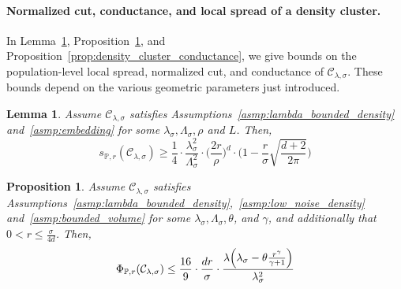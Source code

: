\documentclass[11pt,twoside]{article}
\newtheorem{lemma}{Lemma}
\newtheorem{proposition}{Proposition}
\theoremstyle{definition}
\newcommand{\1}{\mathbf{1}}
\newcommand{\mc}[1]{\mathcal{#1}}
\newcommand{\Pbb}{\mathbb{P}}
\begin{document}
\paragraph{Normalized cut, conductance, and local spread of a density cluster.} In Lemma~\ref{lem:density_cluster_local_spread}, Proposition~\ref{prop:density_cluster_normalized_cut}, and Proposition~\ref{prop:density_cluster_conductance}, we give bounds on the population-level local spread, normalized cut, and conductance of $\mc{C}_{\lambda,\sigma}$. These bounds depend on the various geometric parameters just introduced. 
\begin{lemma}
	\label{lem:density_cluster_local_spread}
	Assume $\mc{C}_{\lambda,\sigma}$ satisfies Assumptions~\ref{asmp:lambda_bounded_density} and~\ref{asmp:embedding} for some $\lambda_{\sigma},\Lambda_{\sigma},\rho$ and $L$. Then,
	\begin{equation}
	\label{eqn:density_cluster_local_spread}
	s_{\Pbb,r}(\mc{C}_{\lambda,\sigma}) \geq \frac{1}{4} \cdot \frac{\lambda_{\sigma}^2}{\Lambda_{\sigma}^2} \cdot \biggl(\frac{2r}{\rho}\biggr)^{d} \cdot \biggl(1 - \frac{r}{\sigma} \sqrt{\frac{d + 2}{2\pi}}\biggr)
	\end{equation}
\end{lemma}

\begin{proposition}
	\label{prop:density_cluster_normalized_cut}
	Assume $\mc{C}_{\lambda,\sigma}$ satisfies Assumptions~\ref{asmp:lambda_bounded_density},~\ref{asmp:low_noise_density} and~\ref{asmp:bounded_volume} for some $\lambda_{\sigma}, \Lambda_{\sigma}, \theta$, and $\gamma$, and additionally that $0 < r \leq \frac{\sigma}{4d}$. Then,
	\begin{equation}
	\label{eqn:density_cluster_normalized_cut}
	\Phi_{\Pbb,r}(\mc{C}_{\lambda,\sigma}) \leq \frac{16}{9} \cdot \frac{dr}{\sigma} \cdot \frac{\lambda\Bigl(\lambda_{\sigma} - \theta \frac{r^{\gamma}}{\gamma + 1}\Bigr)}{\lambda_{\sigma}^2}
	\end{equation}
\end{proposition}
\end{document}
